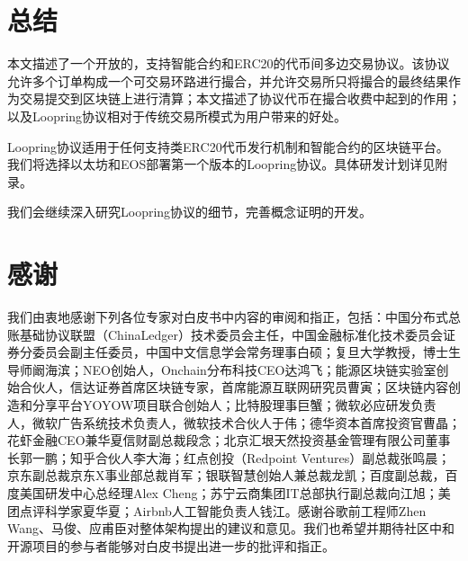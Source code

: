 \documentclass[UTF8,nofonts]{ctexart}
\begin{document}

\section{总结\label{sec:summary}}

本文描述了一个开放的，支持智能合约和ERC20的代币间多边交易协议。该协议允许多个订单构成一个可交易环路进行撮合，并允许交易所只将撮合的最终结果作为交易提交到区块链上进行清算；本文描述了协议代币在撮合收费中起到的作用；以及Loopring协议相对于传统交易所模式为用户带来的好处。

Loopring协议适用于任何支持类ERC20代币发行机制和智能合约的区块链平台。我们将选择以太坊和EOS部署第一个版本的Loopring协议。具体研发计划详见附录。

我们会继续深入研究Loopring协议的细节，完善概念证明的开发。

\section{感谢\label{sec:acknowledgement}}

我们由衷地感谢下列各位专家对白皮书中内容的审阅和指正，包括：中国分布式总账基础协议联盟（ChinaLedger）技术委员会主任，中国金融标准化技术委员会证券分委员会副主任委员，中国中文信息学会常务理事白硕；复旦大学教授，博士生导师阚海滨；NEO创始人，Onchain分布科技CEO达鸿飞；能源区块链实验室创始合伙人，信达证券首席区块链专家，首席能源互联网研究员曹寅；区块链内容创造和分享平台YOYOW项目​联合创始人；比特股理事巨蟹；微软必应研发负责人，微软广告系统技术负责人，微软技术合伙人于伟；德华资本首席投资官​曹晶；花虾金融CEO兼华夏信财副总裁段念；北京汇垠天然投资基金管理有限公司董事长郭一鹏；知乎合伙人李大海；红点创投（Redpoint Ventures）副总裁张鸣晨；京东副总裁京东X事业部总裁肖军；银联智慧创始人兼总裁龙凯；百度副总裁，百度美国研发中心总经理Alex Cheng；苏宁云商集团IT总部执行副总裁向江旭；美团点评科学家夏华夏；Airbnb人工智能负责人钱江。感谢谷歌前工程师Zhen Wang、马俊、应甫臣对整体架构提出的建议和意见。我们也希望并期待社区中和开源项目的参与者能够对白皮书提出进一步的批评和指正。

\newpage



\newpage
\end{document}
